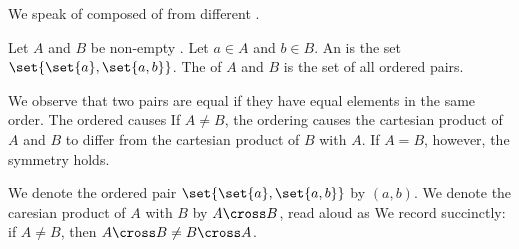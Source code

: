 
\sbasic



\sstart



We speak of
composed of
from different
.


Let $A$ and $B$ be
non-empty
.
Let $a \in A$ and
$b \in B$.
An
is the set
$\set{\set{a}, \set{a, b}}$.
The
of $A$ and $B$ is the set
of all ordered pairs.

We observe that two pairs
are equal if they have equal
elements in the same order.
The ordered causes
If $A \neq B$,
the ordering causes
the cartesian product of
$A$ and $B$
to differ from
the cartesian product of
$B$ with $A$.
If $A = B$, however, the
symmetry holds.

We denote the ordered pair
$\set{\set{a},\set{a,b}}$
by $(a, b)$.
We denote the caresian product
of $A$ with $B$ by
$A \cross B$, read aloud as
We record succinctly:
 if $A \neq B$, then
$A \cross B \neq B \cross A$.

\strats
